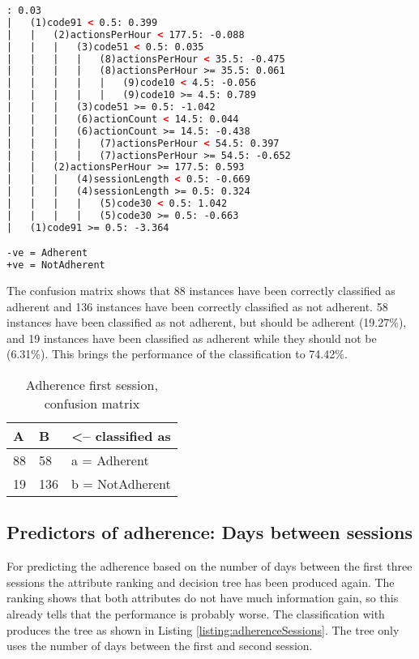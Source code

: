 \begin{lstlisting}[caption={Adherence first session, ADTree decision tree}, label=listing:adherenceFirstTree, float=htpb, language=xml]
: 0.03
|	(1)code91 < 0.5: 0.399
|	|	(2)actionsPerHour < 177.5: -0.088
|	|	|	(3)code51 < 0.5: 0.035
|	|	|	|	(8)actionsPerHour < 35.5: -0.475
|	|	|	|	(8)actionsPerHour >= 35.5: 0.061
|	|	|	|	|	(9)code10 < 4.5: -0.056
|	|	|	|	|	(9)code10 >= 4.5: 0.789
|	|	|	(3)code51 >= 0.5: -1.042
|	|	|	(6)actionCount < 14.5: 0.044
|	|	|	(6)actionCount >= 14.5: -0.438
|	|	|	|	(7)actionsPerHour < 54.5: 0.397
|	|	|	|	(7)actionsPerHour >= 54.5: -0.652
|	|	(2)actionsPerHour >= 177.5: 0.593
|	|	|	(4)sessionLength < 0.5: -0.669
|	|	|	(4)sessionLength >= 0.5: 0.324
|	|	|	|	(5)code30 < 0.5: 1.042
|	|	|	|	(5)code30 >= 0.5: -0.663
|	(1)code91 >= 0.5: -3.364

-ve = Adherent
+ve = NotAdherent
\end{lstlisting}

The confusion matrix shows that 88 instances have been correctly classified as adherent and 136 instances have been correctly classified as not adherent. 58 instances have been classified as not adherent, but should be adherent (19.27\%), and 19 instances have been classified as adherent while they should not be (6.31\%). This brings the performance of the classification to 74.42\%.

\begin{table}[]
	\centering
	\caption{Adherence first session, \\confusion matrix}
	\label{table:adherenceFirstMatrix}
	\begin{tabular}{@{}ll|l@{}}
		\toprule
		\textbf{A} & \textbf{B} & \textless-- classified as \\ \midrule
		88         & 58         & a = Adherent              \\
		19         & 136        & b = NotAdherent           \\ \bottomrule
	\end{tabular}
\end{table}


\subsection{Predictors of adherence: Days between sessions}
For predicting the adherence based on the number of days between the first three sessions the attribute ranking and decision tree has been produced again. The ranking shows that both attributes do not have much information gain, so this already tells that the performance is probably worse. The classification with  produces the tree as shown in Listing \ref{listing:adherenceSessions}. The tree only uses the number of days between the first and second session.

